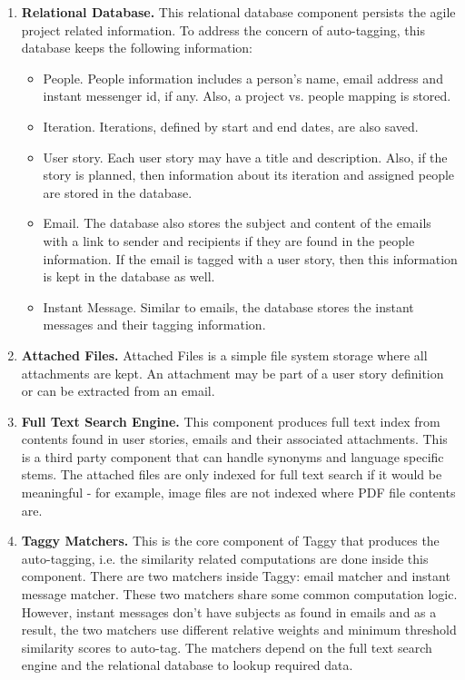 \begin{enumerate}
	\item \textbf{Relational Database.} This relational database component persists the agile project related information. To address the concern of auto-tagging, this database keeps the following information:
		\begin{itemize}
			\item People. People information includes a person's name, email address and instant messenger id, if any. Also, a project vs. people mapping is stored.
			\item Iteration. Iterations, defined by start and end dates, are also saved.
			\item User story. Each user story may have a title and description. Also, if the story is planned, then information about its iteration and assigned people are stored in the database.
			\item Email. The database also stores the subject and content of the emails with a link to sender and recipients if they are found in the people information. If the email is tagged with a user story, then this information is kept in the database as well.
			\item Instant Message. Similar to emails, the database stores the instant messages and their tagging information.
		\end{itemize}

	 \item \textbf{Attached Files.} Attached Files is a simple file system storage where all attachments are kept. An attachment may be part of a user story definition or can be extracted from an email.
	
	 \item \textbf{Full Text Search Engine.} This component produces full text index from contents found in user stories, emails and their associated attachments. This is a third party component that can handle synonyms and language specific stems. The attached files are only indexed for full text search if it would be meaningful - for example, image files are not indexed where PDF file contents are.
	
	\item \textbf{Taggy Matchers.} This is the core component of Taggy that produces the auto-tagging, i.e. the similarity related computations are done inside this component. There are two matchers inside Taggy: email matcher and instant message matcher. These two matchers share some common computation logic. However, instant messages don't have subjects as found in emails and as a result, the two matchers use different relative weights and minimum threshold similarity scores to auto-tag. The matchers depend on the full text search engine and the relational database to lookup required data.
	

\end{enumerate}
